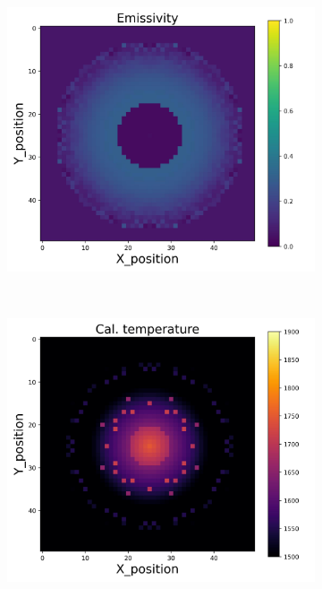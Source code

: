 \begin{figure}[htbp]
\begin{minipage}{\textwidth}
\begin{subfigure}{0.325\textwidth}
        \end{subfigure}
        \begin{subfigure}{0.325\textwidth}
            \centering
            \includegraphics[width=\textwidth]{figures/raw_data/21/exp/emi_cal.jpg}
        \end{subfigure}
    \end{minipage}\\
    \begin{minipage}{\textwidth}
        \centering
        \begin{subfigure}{0.325\textwidth}
            \centering
            \includegraphics[width=\textwidth]{figures/raw_data/5/exp/T_cal.jpg}

\end{subfigure}
\end{minipage}
\end{figure}
